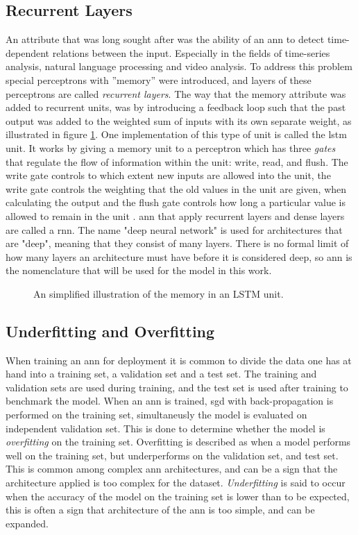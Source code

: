 \subsection{Recurrent Layers}
An attribute that was long sought after was the ability of an \acrshort{ann} to detect time-dependent relations between the input. Especially in the fields of time-series analysis, natural language processing and video analysis. To address this problem special perceptrons with ''memory'' were introduced, and layers of these perceptrons are called \textit{recurrent layers}. The way that the memory attribute was added to recurrent units, was by introducing a feedback loop such that the past output was added to the weighted sum of inputs with its own separate weight, as illustrated in figure \ref{fig:lstm}. One implementation of this type of unit is called the \acrfull{lstm} unit. It works by giving a memory unit to a perceptron which has three \textit{gates} that regulate the flow of information within the unit: write, read, and flush. The write gate controls to which extent new inputs are allowed into the unit, the write gate controls the weighting that the old values in the unit are given, when calculating the output and the flush gate controls how long a particular value is allowed to remain in the unit \cite{lstm_wikipedia}. \acrshort{ann} that apply recurrent layers and dense layers are called a \acrfull{rnn}. The name "deep neural network" is used for architectures that are "deep", meaning that they consist of many layers. There is no formal limit of how many layers an architecture must have before it is considered deep, so \acrfull{ann} is the nomenclature that will be used for the model in this work. 

\begin{figure}[H]
    \centering
    
    \caption{An simplified illustration of the memory in an LSTM unit.}
    \label{fig:lstm}
\end{figure}

\subsection{Underfitting and Overfitting}
When training an \acrshort{ann} for deployment it is common to divide the data one has at hand into a training set, a validation set and a test set. The training and validation sets are used during training, and the test set is used after training to benchmark the model. When an \acrshort{ann} is trained, \acrshort{sgd} with back-propagation is performed on the training set, simultaneusly the model is evaluated on independent validation set. This is done to determine whether the model is \textit{overfitting} on the training set. Overfitting is described as when a model performs well on the training set, but underperforms on the validation set, and test set. This is common among complex \acrshort{ann} architectures, and can be a sign that the architecture applied is too complex for the dataset. \textit{Underfitting} is said to occur when the accuracy of the model on the training set is lower than to be expected, this is often a sign that architecture of the \acrshort{ann} is too simple, and can be expanded.

